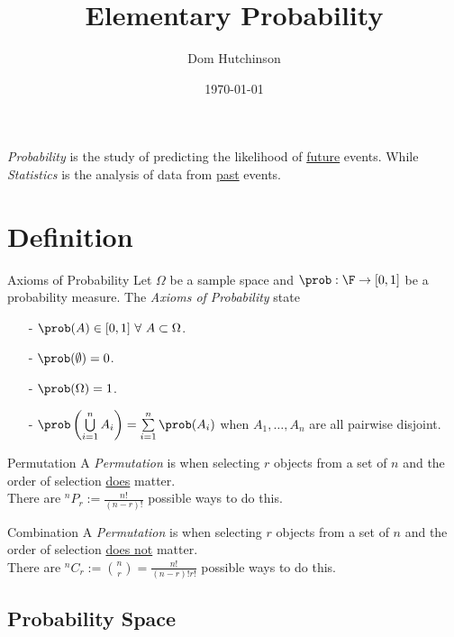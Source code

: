 \documentclass[11pt,a4paper]{article}
\begin{document}
\title{Elementary Probability}
\author{Dom Hutchinson}
\date{\today}
\maketitle

\textit{Probability} is the study of predicting the likelihood of \underline{future} events. While \textit{Statistics} is the analysis of data from \underline{past} events.

\section{Definition}

\begin{definition}{Axioms of Probability}
Let $\Omega$ be a sample space and $\prob:\F\to[0,1]$ be a probability measure. The \textit{Axioms of Probability} state
\begin{itemize}
  \item[-] $\prob(A)\in[0,1]\ \forall\ A\subset\Omega$.
  \item[-] $\prob(\emptyset)=0$.
  \item[-] $\prob(\Omega)=1$.
  \item[-] $\prob\left(\bigcup\limits_{i=1}^nA_i\right)=\sum\limits_{i=1}^n\prob(A_i)$ when $A_1,\dots,A_n$ are all pairwise disjoint.
\end{itemize}
\end{definition}

\begin{definition}{Permutation}
A \textit{Permutation} is when selecting $r$ objects from a set of $n$ and the order of selection \underline{does} matter.\\
There are ${^n}P_r:=\frac{n!}{(n-r)!}$ possible ways to do this.
\end{definition}

\begin{definition}{Combination}
  A \textit{Permutation} is when selecting $r$ objects from a set of $n$ and the order of selection \underline{does not} matter.\\
  There are ${^n}C_r:={n\choose r}=\frac{n!}{(n-r)!r!}$ possible ways to do this.
\end{definition}

\subsection{Probability Space}
\end{document}
